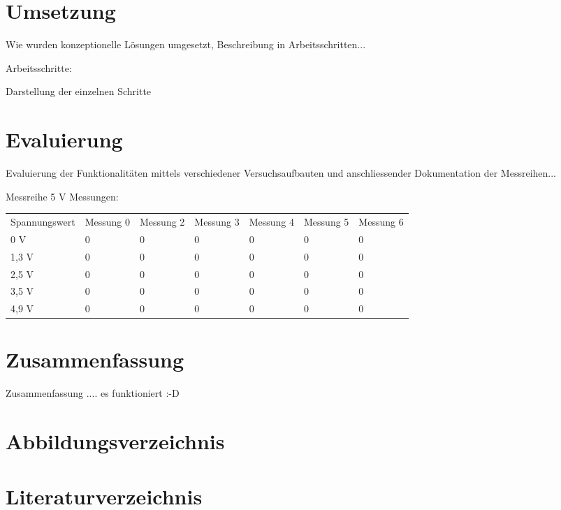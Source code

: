 \documentclass[
	11pt,								%
	a4paper,						%
	oneside,						%
	titlepage,					%
	headsepline,				%
	DIV13,							%
	abstracton,	 				%
	BCOR0cm,						%
	bibliography=totoc, %
]{scrreprt}							%
\begin{document}
\chapter{Umsetzung}
\label{cha:Umsetzung}
Wie wurden konzeptionelle Lösungen umgesetzt, Beschreibung in Arbeitsschritten...

Arbeitsschritte:

Darstellung der einzelnen Schritte


\chapter{Evaluierung}

\label{cha:Evaluierung}


Evaluierung der Funktionalitäten mittels verschiedener Versuchsaufbauten und anschliessender Dokumentation
der Messreihen...

\begin{center}
Messreihe 5 V Messungen:
\begin{tabular}{lllllll}
Spannungswert & Messung  0 & Messung 2 & Messung 3 & Messung 4 & Messung 5 & Messung 6\\
0 V & 0 & 0 & 0 & 0 & 0 & 0\\
1,3 V & 0 & 0 & 0 & 0 & 0 & 0\\
2,5 V & 0 & 0 & 0 & 0 & 0 & 0\\
3,5 V & 0 & 0 & 0 & 0 & 0 & 0\\
4,9 V & 0 & 0 & 0 & 0 & 0 & 0
\end{tabular}
\end{center}



\chapter{Zusammenfassung}
\label{cha:Zusammenfassung}
Zusammenfassung .... es funktioniert :-D

\chapter{Abbildungsverzeichnis}
\label{cha:Abbildungsverzeichnis}

\chapter{Literaturverzeichnis}


%
\end{document}
